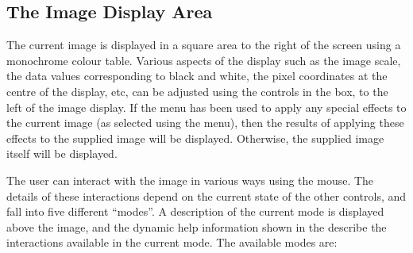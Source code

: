 \subsection {The Image Display Area}
The current image is displayed in a square area to the right of the
screen using a monochrome colour table. Various aspects of the display
such as the image scale, the data values corresponding to black and
white, the pixel coordinates at the centre of the display, etc, can be
adjusted using the controls in the  box, to the left of the image
display. If the  menu has
been used to apply any special effects to the current image (as selected
using the  menu), then the
results of applying these effects to the supplied image will be
displayed. Otherwise, the supplied image itself will be displayed.

The user can interact with the image in various ways using the mouse. The
details of these interactions depend on the current state of the other
controls, and fall into five different ``modes''. A description of the
current mode is displayed above the image, and the dynamic help
information shown in the 
describe the interactions available in the current mode. The available
modes are:

